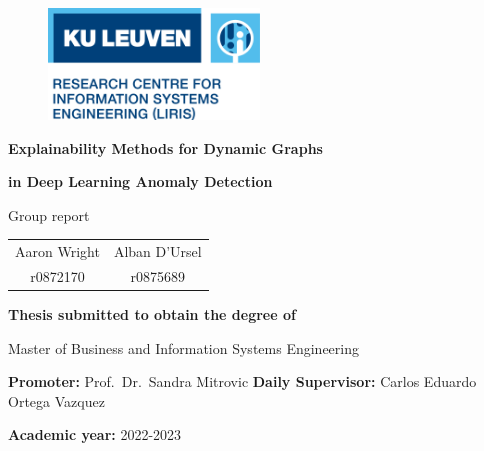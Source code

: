\begin{titlepage}

\begin{figure}[h]
    {\includegraphics[width=0.5\textwidth]{images/logo.png}}
\end{figure}

\vspace*{2cm}
{\Huge \textbf{Explainability Methods for Dynamic Graphs}}

\vspace{.1cm}
{\Huge \textbf{in Deep Learning Anomaly Detection}}
\vspace*{0.5cm} 

{\Large Group report}

{\raggedleft\vfill{
\setlength{\tabcolsep}{12pt}
\begin{tabular}{c c}
        {\Large Aaron Wright}  &  {\Large Alban D'Ursel} \\
        {r0872170}  & {r0875689}
\end{tabular}
\linebreak
\vspace*{1.5cm}

\textbf{{\large Thesis submitted to obtain \linebreak
the degree of}} \linebreak

{\large Master of Business and Information Systems Engineering}\linebreak

\textbf{{\large Promoter:}}   Prof.\ Dr.\ Sandra Mitrovic \linebreak
\textbf{{\large Daily Supervisor:}}  Carlos Eduardo Ortega Vazquez \linebreak

\textbf{{\large Academic year:}} {\large 2022-2023}
\linebreak
}\par}

\end{titlepage}
\restoregeometry
\clearpage
